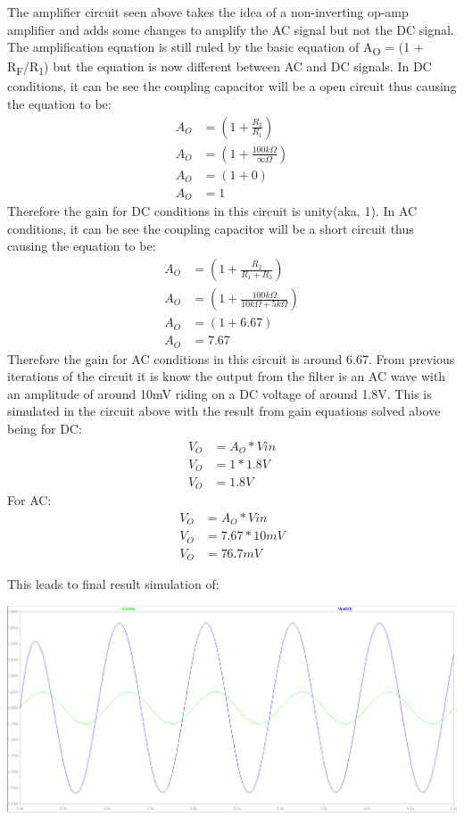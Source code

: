 \documentclass{article}
\begin{document}
The amplifier circuit seen above takes the idea of a non-inverting op-amp amplifier and adds some changes to amplify the AC signal but not the DC signal. The amplification equation is still ruled by the basic equation of A\textsubscript{O} = (1 + R\textsubscript{F}/R\textsubscript{1}) but the equation is now different between AC and DC signals. 
In DC conditions, it can be see the coupling capacitor will be a open circuit thus causing the equation to be:
\begin{align}
A_{O} &= (1 +\frac{R_{2}}{R_{1}}) \\
A_{O} &= (1 +\frac{100k\Omega}{\infty\Omega}) \\
A_{O} &= (1 + 0) \\
A_{O} &= 1
\end{align}
Therefore the gain for DC conditions in this circuit is unity(aka. 1).
In AC conditions, it can be see the coupling capacitor will be a short circuit thus causing the equation to be:
\begin{align}
A_{O} &= (1 +\frac{R_{2}}{R_{1} + R_{3}}) \\
A_{O} &= (1 +\frac{100k\Omega}{10k\Omega + 5k\Omega}) \\
A_{O} &= (1 + 6.67) \\
A_{O} &= 7.67
\end{align}
Therefore the gain for AC conditions in this circuit is around 6.67.
From previous iterations of the circuit it is know the output from the filter is an AC wave with an amplitude of around 10mV riding on a DC voltage of around 1.8V.
This is simulated in the circuit above with the result from gain equations solved above being for DC:
\begin{align}
V_{O} &= A_{O} * V{in} \\
V_{O} &= 1 * 1.8V \\
V_{O} &= 1.8V
\end{align}
For AC:
\begin{align}
V_{O} &= A_{O} * V{in} \\
V_{O} &= 7.67 * 10mV \\
V_{O} &= 76.7mV
\end{align}

This leads to final result simulation of:

\includegraphics[width=\textwidth]{images/Op-Amp Out.png}
\end{document}
